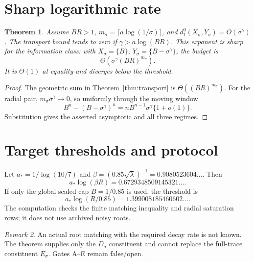 \documentclass[11pt]{article}
\newtheorem{theorem}{Theorem}[section]
\theoremstyle{remark}\newtheorem{remark}[theorem]{Remark}
\begin{document}
\section{Sharp logarithmic rate}
\begin{theorem}\label{thm:clock}
Assume $BR>1$,
$m_\sigma=\lceil a\log(1/\sigma)\rceil$, and
$d_1^0(X_\sigma,Y_\sigma)=O(\sigma^\gamma)$.  The transport bound tends to
zero if $\gamma>a\log(BR)$.  This exponent is sharp for the information
class: with $X_\sigma=\{B\}$,
$Y_\sigma=\{B-\sigma^\gamma\}$, the budget is
\[
 \Theta\!\left(\sigma^\gamma(BR)^{m_\sigma}\right).
\]
It is $\Theta(1)$ at equality and diverges below the threshold.
\end{theorem}
\begin{proof}
The geometric sum in Theorem~\ref{thm:transport} is
$\Theta((BR)^{m_\sigma})$.  For the radial pair,
$m_\sigma\sigma^\gamma\to0$, so uniformly through the moving window
\[
 B^n-(B-\sigma^\gamma)^n
 =nB^{n-1}\sigma^\gamma\{1+o(1)\}.
\]
Substitution gives the asserted asymptotic and all three regimes.
\end{proof}

\section{Target thresholds and protocol}
Let $a_*=1/\log(10/7)$ and
$\beta=(0.85\sqrt\lambda)^{-1}=0.9080523604\ldots$.  Then
\[
 a_*\log(\beta R)=0.6729348509145321\ldots.
\]
If only the global scaled cap $B=1/0.85$ is used, the threshold is
\[
 a_*\log(R/0.85)=1.399008185460602\ldots.
\]
The computation checks the finite matching inequality and radial saturation
rows; it does not use archived noisy roots.

\begin{remark}
An actual root matching with the required decay rate is not known.  The
theorem supplies only the $D_\sigma$ constituent and cannot replace the
full-trace constituent $E_\sigma$.  Gates A--E remain false/open.
\end{remark}
\end{document}
